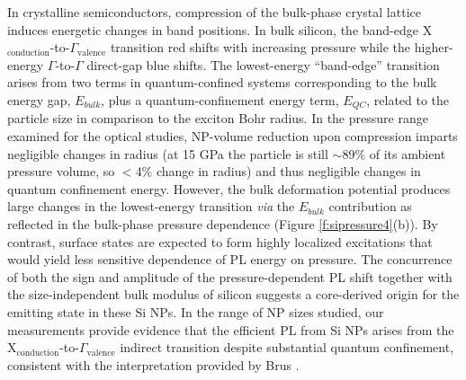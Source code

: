 In crystalline semiconductors, compression of the bulk-phase crystal lattice induces energetic changes in band positions. In bulk silicon, the band-edge X$_{\mathrm{conduction}}$-to-$\Gamma_{\mathrm{valence}}$ transition red shifts with increasing pressure while the higher-energy $\Gamma$-to-$\Gamma$ direct-gap blue shifts. The lowest-energy “band-edge” transition arises from two terms in quantum-confined systems corresponding to the bulk energy gap, $E_{bulk}$, plus a quantum-confinement energy term, $E_{QC}$, related to the particle size in comparison to the exciton Bohr radius. In the pressure range examined for the optical studies, NP-volume reduction upon compression imparts negligible changes in radius (at 15 GPa the particle is still $\sim$89\% of its ambient pressure volume, so $<$4\% change in radius) and thus negligible changes in quantum confinement energy. However, the bulk deformation potential produces large changes in the lowest-energy transition \emph{via} the $E_{bulk}$ contribution as reflected in the bulk-phase pressure dependence (Figure \ref{f:sipressure4}(b)). By contrast, surface states are expected to form highly localized excitations that would yield less sensitive dependence of PL energy on pressure. The concurrence of both the sign and amplitude of the pressure-dependent PL shift together with the size-independent bulk modulus of silicon suggests a core-derived origin for the emitting state in these Si NPs. In the range of NP sizes studied, our measurements provide evidence that the efficient PL from Si NPs arises from the X$_{\mathrm{conduction}}$-to-$\Gamma_{\mathrm{valence}}$ indirect transition despite substantial quantum confinement, consistent with the interpretation provided by Brus \cite{Wilson19111993}.  \par

